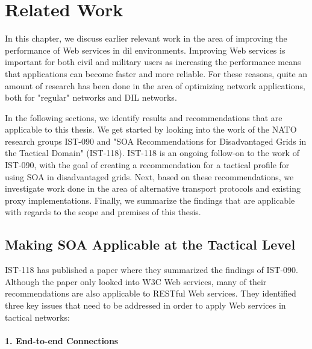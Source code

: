 \chapter{Related Work}
\label{chapter:related-work}


In this chapter, we discuss earlier relevant work in the area of improving the
performance of Web services in \gls{dil} environments. Improving Web services is
important for both civil and military users as increasing the performance means
that applications can become faster and more reliable. For these reasons, quite
an amount of research has been done in the area of optimizing network
applications, both for "regular" networks and DIL networks.

In the following sections, we identify results and recommendations that are
applicable to this thesis. We get started by looking into the work of the NATO
research groups IST-090 and "SOA Recommendations for Disadvantaged Grids in
the Tactical Domain" (IST-118). IST-118 is an ongoing follow-on to the work of
IST-090, with the goal of creating a recommendation for a tactical profile for
using SOA in disadvantaged grids. Next, based on these recommendations, we
investigate work done in the area of alternative transport protocols and
existing proxy implementations.  Finally, we summarize the findings that are
applicable with regards to the scope and premises of this thesis.

\section{Making SOA Applicable at the Tactical Level}

IST-118 has published a paper\cite{ist-118} where they summarized the findings
of IST-090. Although the paper only looked into W3C Web services, many of their
recommendations are also applicable to RESTful Web services. They identified
three key issues that need to be addressed in order to apply Web services in
tactical networks:

\label{section:DIL-problems}

\subsubsection{1. End-to-end Connections}

